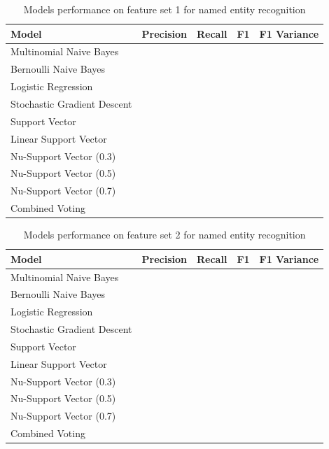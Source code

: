 \documentclass[11pt,oneside]{book}
\begin{document}
\begin{longtable}{|l|l|l|l|l|}
\caption{Models performance on feature set 1 for named entity recognition}
\label{tab:ner_feature_set_1}\\
\hline
\textbf{Model}          & \multicolumn{1}{c|}{\textbf{Precision}} & \multicolumn{1}{c|}{\textbf{Recall}} & \textbf{F1} & \textbf{F1 Variance} \\ \hline
\endfirsthead
%
\endhead
%
Multinomial Naive Bayes & \multicolumn{1}{c|}{}                   & \multicolumn{1}{c|}{}                &             &                      \\ \hline
Bernoulli Naive Bayes       &  &  &  &  \\ \hline
Logistic Regression         &  &  &  &  \\ \hline
Stochastic Gradient Descent &  &  &  &  \\ \hline
Support Vector              &  &  &  &  \\ \hline
Linear Support Vector       &  &  &  &  \\ \hline
Nu-Support Vector (0.3)     &  &  &  &  \\ \hline
Nu-Support Vector (0.5)     &  &  &  &  \\ \hline
Nu-Support Vector (0.7)     &  &  &  &  \\ \hline
Combined Voting             &  &  &  &  \\ \hline
\end{longtable}

\begin{longtable}{|l|l|l|l|l|}
\caption{Models performance on feature set 2 for named entity recognition}
\label{tab:ner_feature_set_2}\\
\hline
\textbf{Model}          & \multicolumn{1}{c|}{\textbf{Precision}} & \multicolumn{1}{c|}{\textbf{Recall}} & \textbf{F1} & \textbf{F1 Variance} \\ \hline
\endfirsthead
%
\endhead
%
Multinomial Naive Bayes & \multicolumn{1}{c|}{}                   & \multicolumn{1}{c|}{}                &             &                      \\ \hline
Bernoulli Naive Bayes       &  &  &  &  \\ \hline
Logistic Regression         &  &  &  &  \\ \hline
Stochastic Gradient Descent &  &  &  &  \\ \hline
Support Vector              &  &  &  &  \\ \hline
Linear Support Vector       &  &  &  &  \\ \hline
Nu-Support Vector (0.3)     &  &  &  &  \\ \hline
Nu-Support Vector (0.5)     &  &  &  &  \\ \hline
Nu-Support Vector (0.7)     &  &  &  &  \\ \hline
Combined Voting             &  &  &  &  \\ \hline
\end{longtable}
\end{document}
